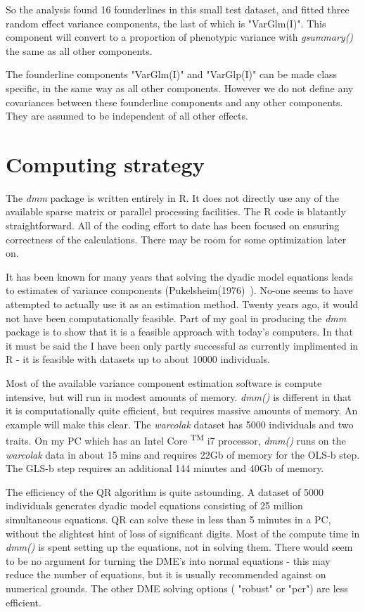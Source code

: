 \documentclass[titlepage]{article}  %
\begin{document}
So the analysis found 16 founderlines in this small test dataset, and fitted three random effect variance components, the last of which is "VarGlm(I)".  This component will convert to a proportion of phenotypic variance with {\em gsummary()}  the same as all other components. 

The founderline components "VarGlm(I)" and "VarGlp(I)" can be made class specific, in the same way as all other components. However we do not define any covariances between these founderline components and any other components. They are assumed to be independent of all other effects.

\clearpage
\section{Computing strategy}
The {\em dmm} package is written entirely in R. It does not directly use any of the available sparse matrix or parallel processing facilities. The R code is blatantly straightforward. All of the coding effort to date has been focused on ensuring correctness of the calculations. There may be room for some optimization later on.

It has been known for many years that solving the dyadic model equations leads to estimates of variance components (Pukelsheim(1976)~\cite{puke:76}).  No-one seems to have attempted to actually use it as an estimation method. Twenty years ago, it would not have been computationally feasible. Part of my goal in producing the {\em dmm} package is to show that it is a feasible approach with today's computers. In that it must be said the I have been only partly successful as currently implimented in R - it is feasible with datasets up to about 10000 individuals.

Most of the available variance component estimation software is compute intensive, but will run in modest amounts of memory. {\em dmm()} is different in that it is computationally quite efficient, but requires massive amounts of memory. An example will make this clear. The {\em warcolak} dataset has 5000 individuals and two traits. On my PC which has an Intel \textregistered \hspace{1pt} Core \textsuperscript{TM} i7 processor, {\em dmm()} runs on the {\em warcolak} data in about 15 mins and requires 22Gb of memory for the OLS-b step. The GLS-b step requires an additional 144 minutes and 40Gb of memory. 

The efficiency of the QR algorithm is quite astounding. A dataset of 5000 individuals generates dyadic model equations consisting of 25 million simultaneous equations. QR can solve these in less than 5 minutes in a PC, without the slightest hint of loss of significant digits. Most of the compute time in {\em dmm()} is spent setting up the equations, not in solving them. There would seem to be no argument for turning the DME's into normal equations - this may reduce the number of equations, but it is usually recommended against on numerical grounds. The other DME solving options ( "robust" or "pcr") are less efficient.
\end{document}
